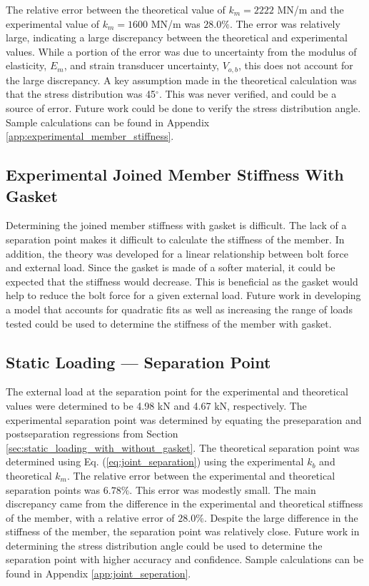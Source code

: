 The relative error between the theoretical value of $k_m = 2222$ MN/m and the experimental value of $k_m = 1600$ MN/m was $28.0\%$. The error was relatively large, indicating a large discrepancy between the theoretical and experimental values. While a portion of the error was due to uncertainty from the modulus of elasticity, $E_m$, and strain transducer uncertainty, $V_{o, b}$, this does not account for the large discrepancy. A key assumption made in the theoretical calculation was that the stress distribution was 45$^\circ$. This was never verified, and could be a source of error. Future work could be done to verify the stress distribution angle. Sample calculations can be found in Appendix \ref{app:experimental_member_stiffness}.

\subsection{Experimental Joined Member Stiffness With Gasket}
Determining the joined member stiffness with gasket is difficult. The lack of a separation point makes it difficult to calculate the stiffness of the member. In addition, the theory was developed for a linear relationship between bolt force and external load. Since the gasket is made of a softer material, it could be expected that the stiffness would decrease. This is beneficial as the gasket would help to reduce the bolt force for a given external load. Future work in developing a model that accounts for quadratic fits as well as increasing the range of loads tested could be used to determine the stiffness of the member with gasket.

\subsection{Static Loading --- Separation Point}
The external load at the separation point for the experimental and theoretical values were determined to be 4.98 kN and 4.67 kN, respectively. The experimental separation point was determined by equating the preseparation and postseparation regressions from Section \ref{sec:static_loading_with_without_gasket}. The theoretical separation point was determined using Eq. (\ref{eq:joint_separation}) using the experimental $k_b$ and theoretical $k_m$. The relative error between the experimental and theoretical separation points was $6.78\%$. This error was modestly small. The main discrepancy came from the difference in the experimental and theoretical stiffness of the member, with a relative error of $28.0\%$. Despite the large difference in the stiffness of the member, the separation point was relatively close. Future work in determining the stress distribution angle could be used to determine the separation point with higher accuracy and confidence. Sample calculations can be found in Appendix \ref{app:joint_seperation}.

